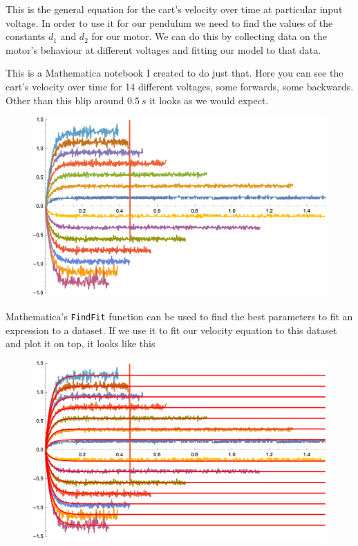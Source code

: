 \documentclass{article}
\begin{document}
This is the general equation for the cart's velocity over time at particular input voltage. In order to use it for our pendulum we need to find the values of the constants $d_1$ and $d_2$ for our motor. We can do this by collecting data on the motor's behaviour at different voltages and fitting our model to that data.

This is a Mathematica notebook I created to do just that. Here you can see the cart's velocity over time for 14 different voltages, some forwards, some backwards. Other than this blip around $\qty{0.5}{s}$ it looks as we would expect.

\begin{figure}[H]
  \centering
  \includegraphics[width=\textwidth]{angular_velocities}
\end{figure}

Mathematica's \texttt{FindFit} function can be used to find the best parameters to fit an expression to a dataset. If we use it to fit our velocity equation to this dataset and plot it on top, it looks like this

\begin{figure}[H]
  \centering
  \includegraphics[width=\textwidth]{angular_velocities_fitted}
\end{figure}
\end{document}
